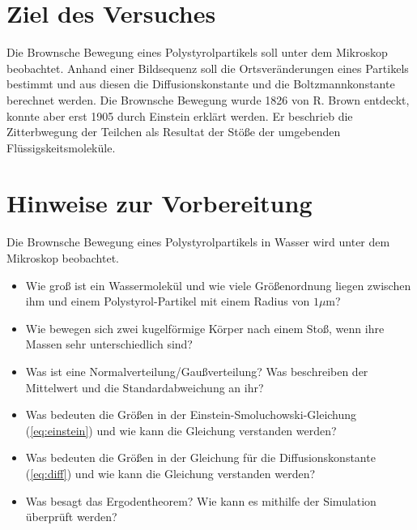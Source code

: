 \section*{Ziel des Versuches}

Die Brownsche Bewegung eines Polystyrolpartikels soll unter dem Mikroskop beobachtet. Anhand einer Bildsequenz soll die Ortsveränderungen eines Partikels bestimmt und aus diesen die Diffusionskonstante und die Boltzmannkonstante berechnet werden. Die Brownsche Bewegung wurde 1826 von R. Brown entdeckt, konnte aber erst 1905 durch Einstein erklärt werden. Er beschrieb die Zitterbwegung der Teilchen als Resultat der Stöße der umgebenden Flüssigskeitsmoleküle.

\section*{Hinweise zur Vorbereitung}
Die Brownsche Bewegung eines Polystyrolpartikels in Wasser wird unter dem Mikroskop beobachtet.
\begin{itemize}
  \item Wie groß ist ein Wassermolekül und wie viele Größenordnung liegen zwischen ihm und einem Polystyrol-Partikel mit einem Radius von $1 \mu$m?
  \item Wie bewegen sich zwei kugelförmige Körper nach einem Stoß, wenn ihre Massen sehr unterschiedlich sind?
  \item Was ist eine Normalverteilung/Gaußverteilung? Was beschreiben der Mittelwert und die Standardabweichung an ihr?
  \item Was bedeuten die Größen in der Einstein-Smoluchowski-Gleichung (\ref{eq:einstein}) und wie kann die Gleichung verstanden werden?
  \item Was bedeuten die Größen in der Gleichung für die Diffusionskonstante (\ref{eq:diff}) und wie kann die Gleichung verstanden werden?
  \item Was besagt das Ergodentheorem? Wie kann es mithilfe der Simulation überprüft werden?
\end{itemize}
